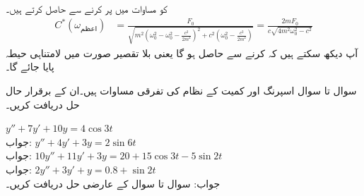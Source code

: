  کو مساوات  میں پر کرنے سے  حاصل کرتے ہیں۔
\begin{align}
C^*(\omega_{\text{اعظم}})&=\frac{F_0}{\sqrt{m^2(\omega_0^2-\omega_0^2-\frac{c^2}{2m^2})^2+c^2(\omega_0^2-\frac{c^2}{2m^2})}}=\frac{2mF_0}{c\sqrt{4m^2\omega_0^2-c^2}}
\end{align}
آپ دیکھ سکتے ہیں کہ  کرنے سے  حاصل ہو گا یعنی بلا تقصیر صورت میں لامتناہی حیطہ پایا جائے گا۔


سوال  تا سوال  اسپرنگ اور کمیت کے نظام کی تفرقی مساوات ہیں۔ان کے برقرار حال حل دریافت کریں۔

\quad
$y''+7y'+10y=4\cos 3t$\\
جواب:
\quad
$y''+4y'+3y=2\sin 6t$\\
جواب:
\quad
$10y''+11y'+3y=20+15\cos 3t-5\sin 2t$\\
جواب:
\quad
$2y''+3y'+y=0.8+\sin 2t$\\
جواب:
سوال  تا سوال  کے عارضی حل دریافت کریں۔


